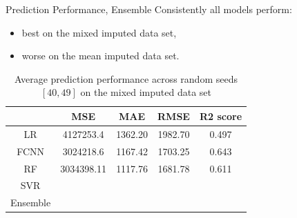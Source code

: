 \documentclass[xcolor=table]{beamer} %
\begin{document}
\begin{frame}{Prediction Performance, Ensemble}
\vspace{-0.9cm}
 Consistently all models perform:
  \begin{itemize}
      \item best on the mixed imputed data set,
      \item worse on the mean imputed data set.
  \end{itemize}
  \begin{table}[ht!]
    \hspace{-0.7cm}
    \begin{tabular}{|c|c|c|c|c|}
        \hline
                 & MSE        & MAE     & RMSE    & R2 score\\
        \hline
        LR       & 4127253.4  & 1362.20 & 1982.70 & 0.497 \\
        FCNN     & 3024218.6  & 1167.42 & 1703.25 & 0.643 \\
        RF       & 3034398.11 & 1117.76 & 1681.78 & 0.611  \\
        SVR      &            &         &         & \\
        Ensemble &            &         &         & \\
        \hline
    \end{tabular}
    \caption{Average prediction performance across random seeds $[40, 49]$ on the mixed imputed data set}
    \label{tab:pred_perf}
\end{table}
\end{frame}
\end{document}
